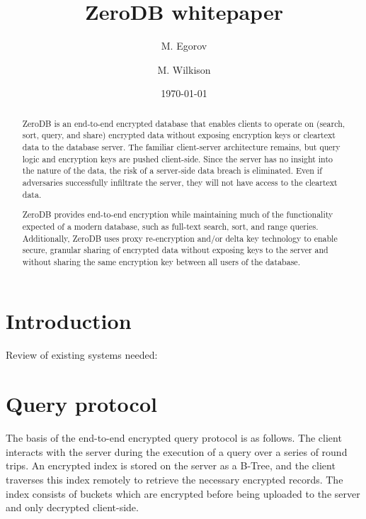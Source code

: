 \documentclass[notitlepage]{revtex4-1}
\begin{document}
\title{ZeroDB whitepaper}

\author{M. Egorov}
\author{M. Wilkison}

\begin{abstract}
ZeroDB is an end-to-end encrypted database that enables clients to operate on (search, sort, query, and share) encrypted data without exposing encryption keys or cleartext data to the database server.
The familiar client-server architecture remains, but query logic and encryption keys are pushed client-side.
Since the server has no insight into the nature of the data, the risk of a server-side data breach is eliminated.
Even if adversaries successfully infiltrate the server, they will not have access to the cleartext data.

ZeroDB provides end-to-end encryption while maintaining much of the functionality expected of a modern database, such as full-text search, sort, and range queries.
Additionally, ZeroDB uses proxy re-encryption and/or delta key technology to enable secure, granular sharing of encrypted data without exposing keys to the server and without sharing the same encryption key between all users of the database.
\end{abstract}

\date{\today}
\maketitle

\section{Introduction}

Review of existing systems needed:~\cite{cipherbase}~\cite{cryptdb}~\cite{gentry}~\cite{smart}

\section{Query protocol}

The basis of the end-to-end encrypted query protocol is as follows.
The client interacts with the server during the execution of a query over a series of round trips.
An encrypted index is stored on the server as a B-Tree, and the client traverses this index remotely to retrieve the necessary encrypted records.
The index consists of buckets which are encrypted before being uploaded to the server and only decrypted client-side.
\end{document}
